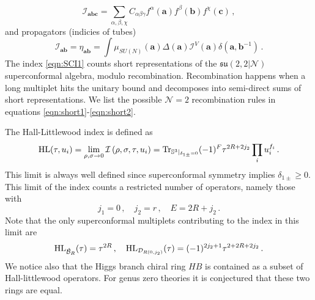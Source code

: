 \documentclass[main.tex]{subfiles}
\begin{document}
\begin{equation}
\mathcal{I}_{\mathbf{a}\mathbf{b}\mathbf{c}}=\sum_{\alpha,\beta,\chi}C_{\alpha\beta\gamma}f^{\alpha}(\mathbf{a})f^{\beta}(\mathbf{b})f^{\chi}(\mathbf{c})\,,
\end{equation} 
and propagators (indicies of tubes)
\begin{equation}
\mathcal{I}_{\mathbf{a}\mathbf{b}}=\eta_{\mathbf{a}\mathbf{b}}=\int\mu_{SU(N)}(\mathbf{a})\Delta(\mathbf{a})\mathcal{I}^V(\mathbf{a})\delta(\mathbf{a},\mathbf{b}^{-1})\,.
\end{equation}
The index \eqref{eqn:SCI1} counts short representations of the $\mathfrak{su}(2,2|\mathcal{N})$ superconformal algebra, modulo recombination.
Recombination happens when a long multiplet hits the unitary bound and decomposes into semi-direct sums of short representations. We list the possible $\mathcal{N}=2$ recombination rules in equations \eqref{eqn:short1}-\eqref{eqn:short2}. 

The Hall-Littlewood index is defined as
\begin{equation}
\textrm{HL}(\tau,u_i)=\lim_{\rho,\sigma\to0}\mathcal{I}\left(\rho,\sigma,\tau,u_i\right)=\operatorname{Tr}_{\mathbb{S}^3|_{\delta_{1\pm}=0}}(-1)^F\tau^{2R+2j_2}\prod_i u_i^{f_i}\,.
\end{equation}
This limit is always well defined since superconformal symmetry implies $\delta_{1\pm}\geq0$. This limit of the index counts a restricted number of operators, namely those with
\begin{equation}
j_1=0\,,\quad j_2=r\,,\quad E=2R+j_2\,.
\end{equation} 
Note that the only superconformal multiplets contributing to the index in this limit are
\begin{equation}
\textrm{HL}_{\hat{\mathcal{B}}_{R}}(\tau)=\tau^{2R}\,,\quad \textrm{HL}_{\mathcal{D}_{R(0,j_2)}}(\tau)=(-1)^{2j_2+1}\tau^{2+2R+2j_2}\,.
\end{equation}
We notice also that the Higgs branch chiral ring $HB$ is contained as a subset of Hall-littlewood operators. For genus zero theories it is conjectured that these two rings are equal.
\end{document}
